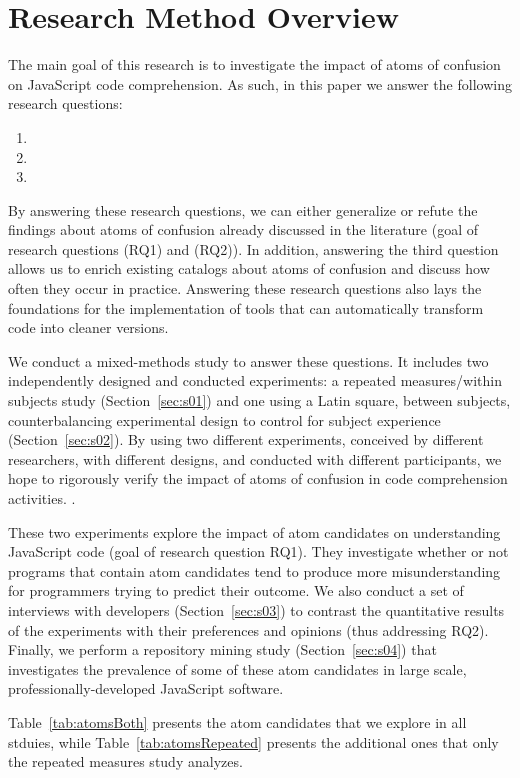 \section{Research Method Overview}
\label{method}

The main goal of this research is to investigate the impact of atoms of confusion on JavaScript code comprehension. As such, in this paper we answer the following research questions: 

\begin{enumerate}[(RQ1)]
\item \rqa 
\item \rqb
\item \rqd
\end{enumerate}

By answering these research questions, we can either generalize or refute the findings about atoms of confusion already discussed in the literature
(goal of research questions (RQ1) and (RQ2)). 
In addition, answering the third question allows us to enrich existing catalogs about atoms of confusion and discuss how often they occur in practice. Answering these research questions also lays the foundations for the implementation of tools that can automatically transform code into cleaner versions.

We conduct a mixed-methods study to answer these questions. 
It includes two independently designed and conducted experiments: a repeated measures/within subjects study (Section~\ref{sec:s01}) and one using a Latin square, between subjects, counterbalancing experimental design to control for subject experience (Section~\ref{sec:s02}). By using two different experiments, conceived by different researchers, with different designs, and conducted with different participants, we hope to rigorously verify the impact of atoms of confusion in code comprehension activities. .

These two experiments explore the impact of atom candidates on understanding JavaScript code (goal of research question RQ1). They investigate whether or not programs that contain atom candidates tend to produce more misunderstanding for programmers trying to predict their outcome.%
We also conduct a set of interviews with developers (Section~\ref{sec:s03}) to contrast the quantitative results of the experiments with their preferences and opinions (thus addressing RQ2). Finally, we perform a repository mining study (Section~\ref{sec:s04}) that investigates the prevalence of some of these atom candidates in large scale, professionally-developed JavaScript software.

Table~\ref{tab:atomsBoth} presents the atom candidates that we explore in all stduies, while Table~\ref{tab:atomsRepeated} presents the additional 
ones that only the repeated measures study analyzes. 


